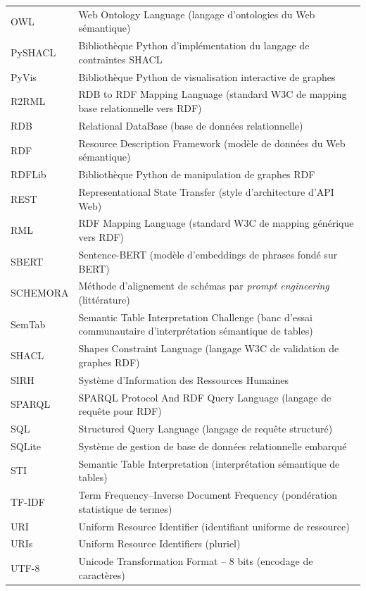 \begin{longtable}{p{3.2cm} p{10.8cm}}
OWL       & Web Ontology Language (langage d'ontologies du Web sémantique) \\
PySHACL   & Bibliothèque Python d'implémentation du langage de contraintes SHACL \\
PyVis     & Bibliothèque Python de visualisation interactive de graphes \\
R2RML     & RDB to RDF Mapping Language (standard W3C de mapping base relationnelle vers RDF) \\
RDB       & Relational DataBase (base de données relationnelle) \\
RDF       & Resource Description Framework (modèle de données du Web sémantique) \\
RDFLib    & Bibliothèque Python de manipulation de graphes RDF \\
REST      & Representational State Transfer (style d'architecture d'API Web) \\
RML       & RDF Mapping Language (standard W3C de mapping générique vers RDF) \\
SBERT     & Sentence-BERT (modèle d'embeddings de phrases fondé sur BERT) \\
SCHEMORA  & Méthode d'alignement de schémas par \textit{prompt engineering} (littérature) \\
SemTab    & Semantic Table Interpretation Challenge (banc d'essai communautaire d'interprétation sémantique de tables) \\
SHACL     & Shapes Constraint Language (langage W3C de validation de graphes RDF) \\
SIRH      & Système d'Information des Ressources Humaines \\
SPARQL    & SPARQL Protocol And RDF Query Language (langage de requête pour RDF) \\
SQL       & Structured Query Language (langage de requête structuré) \\
SQLite    & Système de gestion de base de données relationnelle embarqué \\
STI       & Semantic Table Interpretation (interprétation sémantique de tables) \\
TF-IDF    & Term Frequency--Inverse Document Frequency (pondération statistique de termes) \\
URI       & Uniform Resource Identifier (identifiant uniforme de ressource) \\
URIs      & Uniform Resource Identifiers (pluriel) \\
UTF-8     & Unicode Transformation Format -- 8 bits (encodage de caractères) \\

\end{longtable}
